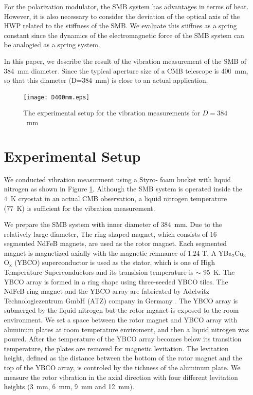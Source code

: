 \documentclass[a4paper]{jpconf}
\begin{document}
For the polarization modulator, the SMB system has advantages in terms of heat.
However, it is also necessary to consider the deviation of the optical axis of the HWP related to the stiffness of the SMB.
We evaluate this stiffnes as a spring constant since the dynamics of the electromagnetic force of the SMB system can be analogied as a spring system.

In this paper, we describe the result of the vibration measurement of the SMB of 384~mm diameter.
Since the typical aperture size of a CMB telescope is 400~mm, so that this diameter (D=384~mm) is close to an actual application.

\begin{figure}[htbp]
   \centering
   \texttt{[image: D400mm.eps]}
   \caption{The experimental setup for the vibration measurements for $D=384$~mm}
   \label{fig:d400}
\end{figure}


\section*{Experimental Setup}


We conducted vibration measurment using a Styro- foam bucket with liquid nitrogen as shown in Figure \ref{fig:d400}.
Although the SMB system is operated inside the 4~K cryostat in an actual CMB observation, a liquid nitrogen temperature (77~K) is sufficient for the vibration measurement.

We prepare the SMB system with inner diameter of 384~mm.
Due to the relatively large diameter, The ring shaped magnet, which consists of 16 segmented NdFeB magnets, are used as the rotor magnet.
Each segmented magnet is magnetized axially with the magnetic remnance of 1.24 T.
A YBa$_{2}$Cu$_{3}$O$_{\mathrm{x}}$ (YBCO) superconductor is used as the stator, which is one of High Temperature Superconductors and its transision temperature is $\sim$ 95~K.
The YBCO array is formed in a ring shape using three-seeded YBCO tiles.
The NdFeB ring magnet and the YBCO array are fabricated by Adelwitz Technologiezentrum GmbH (ATZ) company in Germany \cite{ATZ}.
The YBCO array is submerged by the liquid nitrogen but the rotor mganet is exposed to the room environment.
We set a space between the rotor magnet and YBCO array with aluminum plates at room temperature enviroment, and then a liquid nitrogen was poured.
After the temperature of the YBCO array becomes below its transition temperature, the plates are removed for magnetic levitation.
The levitation height, defined as the distance between the bottom of the rotor magnet and the top of the YBCO array, is controled by the tichness of the aluminum plate.
We measure the rotor vibration in the axial direction with four different levitation heights (3~mm, 6~mm, 9~mm and 12~mm).
\end{document}
